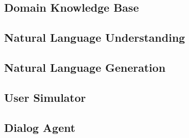 \subsection{Domain Knowledge Base}

\subsection{ Natural Language Understanding}
\subsection{ Natural Language Generation}
\subsection{User Simulator}
\subsection{Dialog Agent}



